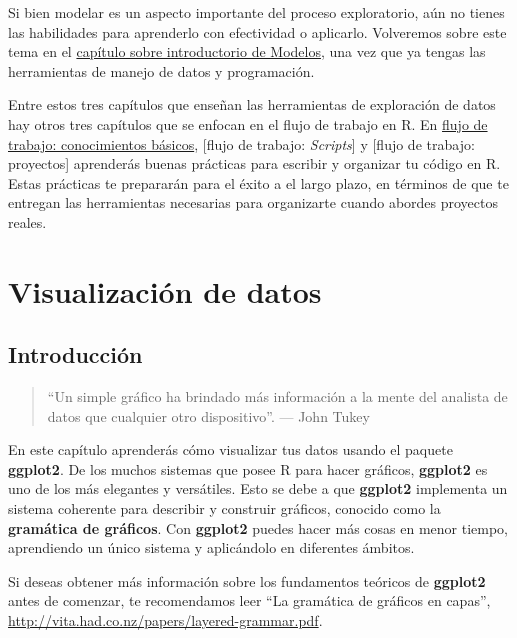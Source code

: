 \documentclass[11pt,oneside]{report}
\begin{document}
Si bien modelar es un aspecto importante del proceso exploratorio, aún
no tienes las habilidades para aprenderlo con efectividad o aplicarlo.
Volveremos sobre este tema en el
\protect\hyperlink{model-intro}{capítulo sobre introductorio de
Modelos}, una vez que ya tengas las herramientas de manejo de datos y
programación.

Entre estos tres capítulos que enseñan las herramientas de exploración
de datos hay otros tres capítulos que se enfocan en el flujo de trabajo
en R. En
\protect\hyperlink{flujo-de-trabajo-conocimientos-buxe1sicos}{flujo de
trabajo: conocimientos básicos}, {[}flujo de trabajo: \emph{Scripts}{]}
y {[}flujo de trabajo: proyectos{]} aprenderás buenas prácticas para
escribir y organizar tu código en R. Estas prácticas te prepararán para
el éxito a el largo plazo, en términos de que te entregan las
herramientas necesarias para organizarte cuando abordes proyectos
reales.

\hypertarget{visualizaciuxf3n-de-datos}{%
\chapter{Visualización de datos}\label{visualizaciuxf3n-de-datos}}

\hypertarget{introducciuxf3n-1}{%
\section{Introducción}\label{introducciuxf3n-1}}

\begin{quote}
``Un simple gráfico ha brindado más información a la mente del analista
de datos que cualquier otro dispositivo''. --- John Tukey
\end{quote}

En este capítulo aprenderás cómo visualizar tus datos usando el paquete
\textbf{ggplot2}. De los muchos sistemas que posee R para hacer
gráficos, \textbf{ggplot2} es uno de los más elegantes y versátiles.
Esto se debe a que \textbf{ggplot2} implementa un sistema coherente para
describir y construir gráficos, conocido como la \textbf{gramática de
gráficos}. Con \textbf{ggplot2} puedes hacer más cosas en menor tiempo,
aprendiendo un único sistema y aplicándolo en diferentes ámbitos.

Si deseas obtener más información sobre los fundamentos teóricos de
\textbf{ggplot2} antes de comenzar, te recomendamos leer ``La gramática
de gráficos en capas'',
\url{http://vita.had.co.nz/papers/layered-grammar.pdf}.
\end{document}
